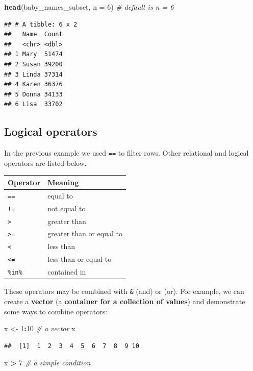 \documentclass[]{book}
\newenvironment{Shaded}{\begin{snugshade}}{\end{snugshade}}
\newcommand{\KeywordTok}[1]{\textcolor[rgb]{0.13,0.29,0.53}{\textbf{#1}}}
\newcommand{\DataTypeTok}[1]{\textcolor[rgb]{0.13,0.29,0.53}{#1}}
\newcommand{\DecValTok}[1]{\textcolor[rgb]{0.00,0.00,0.81}{#1}}
\newcommand{\StringTok}[1]{\textcolor[rgb]{0.31,0.60,0.02}{#1}}
\newcommand{\CommentTok}[1]{\textcolor[rgb]{0.56,0.35,0.01}{\textit{#1}}}
\newcommand{\OperatorTok}[1]{\textcolor[rgb]{0.81,0.36,0.00}{\textbf{#1}}}
\newcommand{\NormalTok}[1]{#1}
\begin{document}
\begin{Shaded}
\begin{Highlighting}[]
\KeywordTok{head}\NormalTok{(baby_names_subset, }\DataTypeTok{n =} \DecValTok{6}\NormalTok{) }\CommentTok{# default is n = 6}
\end{Highlighting}
\end{Shaded}

\begin{verbatim}
## # A tibble: 6 x 2
##   Name  Count
##   <chr> <dbl>
## 1 Mary  51474
## 2 Susan 39200
## 3 Linda 37314
## 4 Karen 36376
## 5 Donna 34133
## 6 Lisa  33702
\end{verbatim}

\subsection{Logical operators}\label{logical-operators}

In the previous example we used \texttt{==} to filter rows. Other
relational and logical operators are listed below.

\begin{longtable}[]{@{}ll@{}}
\toprule
Operator & Meaning\tabularnewline
\midrule
\endhead
\texttt{==} & equal to\tabularnewline
\texttt{!=} & not equal to\tabularnewline
\texttt{\textgreater{}} & greater than\tabularnewline
\texttt{\textgreater{}=} & greater than or equal to\tabularnewline
\texttt{\textless{}} & less than\tabularnewline
\texttt{\textless{}=} & less than or equal to\tabularnewline
\texttt{\%in\%} & contained in\tabularnewline
\bottomrule
\end{longtable}

These operators may be combined with \texttt{\&} (and) or
\texttt{\textbar{}} (or). For example, we can create a \textbf{vector}
(a \textbf{container for a collection of values}) and demonstrate some
ways to combine operators:

\begin{Shaded}
\begin{Highlighting}[]
\NormalTok{x <-}\StringTok{ }\DecValTok{1}\OperatorTok{:}\DecValTok{10} \CommentTok{# a vector}
\NormalTok{x}
\end{Highlighting}
\end{Shaded}

\begin{verbatim}
##  [1]  1  2  3  4  5  6  7  8  9 10
\end{verbatim}

\begin{Shaded}
\begin{Highlighting}[]
\NormalTok{x }\OperatorTok{>}\StringTok{ }\DecValTok{7} \CommentTok{# a simple condition}
\end{Highlighting}
\end{Shaded}
\end{document}

